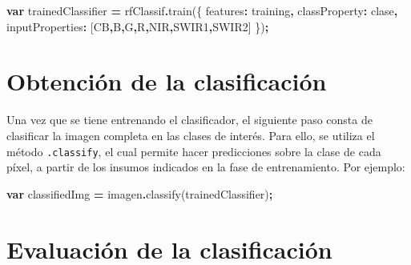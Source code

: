 \documentclass[
  12pt,
  letterpaper,
  twoside]{book}
\newenvironment{Shaded}{\begin{snugshade}}{\end{snugshade}}
\newcommand{\DataTypeTok}[1]{\textcolor[rgb]{0.13,0.29,0.53}{#1}}
\newcommand{\FunctionTok}[1]{\textcolor[rgb]{0.00,0.00,0.00}{#1}}
\newcommand{\KeywordTok}[1]{\textcolor[rgb]{0.13,0.29,0.53}{\textbf{#1}}}
\newcommand{\NormalTok}[1]{#1}
\newcommand{\OperatorTok}[1]{\textcolor[rgb]{0.81,0.36,0.00}{\textbf{#1}}}
\newcommand{\StringTok}[1]{\textcolor[rgb]{0.31,0.60,0.02}{#1}}
\begin{document}
\begin{Shaded}
\begin{Highlighting}[]
\KeywordTok{var}\NormalTok{ trainedClassifier }\OperatorTok{=}\NormalTok{ rfClassif}\OperatorTok{.}\FunctionTok{train}\NormalTok{(\{}
  \DataTypeTok{features}\OperatorTok{:}\NormalTok{ training}\OperatorTok{,}
  \DataTypeTok{classProperty}\OperatorTok{:} \StringTok{\textquotesingle{}clase\textquotesingle{}}\OperatorTok{,}
  \DataTypeTok{inputProperties}\OperatorTok{:}\NormalTok{ [}\StringTok{\textquotesingle{}CB\textquotesingle{}}\OperatorTok{,}\StringTok{\textquotesingle{}B\textquotesingle{}}\OperatorTok{,}\StringTok{\textquotesingle{}G\textquotesingle{}}\OperatorTok{,}\StringTok{\textquotesingle{}R\textquotesingle{}}\OperatorTok{,}\StringTok{\textquotesingle{}NIR\textquotesingle{}}\OperatorTok{,}\StringTok{\textquotesingle{}SWIR1\textquotesingle{}}\OperatorTok{,}\StringTok{\textquotesingle{}SWIR2\textquotesingle{}}\NormalTok{]}
\NormalTok{\})}\OperatorTok{;}
\end{Highlighting}
\end{Shaded}

\hypertarget{obtenciuxf3n-de-la-clasificaciuxf3n}{%
\section{Obtención de la clasificación}\label{obtenciuxf3n-de-la-clasificaciuxf3n}}

Una vez que se tiene entrenando el clasificador, el siguiente paso consta de clasificar la imagen completa en las clases de interés. Para ello, se utiliza el método \texttt{.classify}, el cual permite hacer predicciones sobre la clase de cada píxel, a partir de los insumos indicados en la fase de entrenamiento. Por ejemplo:

\begin{Shaded}
\begin{Highlighting}[]
\KeywordTok{var}\NormalTok{ classifiedImg }\OperatorTok{=}\NormalTok{ imagen}\OperatorTok{.}\FunctionTok{classify}\NormalTok{(trainedClassifier)}\OperatorTok{;}
\end{Highlighting}
\end{Shaded}

\hypertarget{evaluaciuxf3n-de-la-clasificaciuxf3n}{%
\section{Evaluación de la clasificación}\label{evaluaciuxf3n-de-la-clasificaciuxf3n}}
\end{document}
